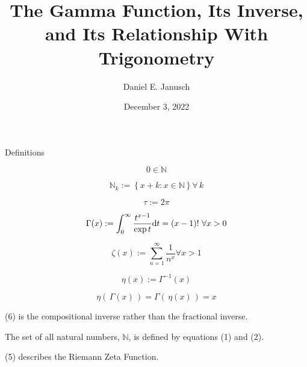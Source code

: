 \documentclass[12pt]{article}
\begin{document}
\title{The Gamma Function, Its Inverse, and Its Relationship With Trigonometry}
\author{Daniel E. Janusch}
\date{December 3, 2022} %
\maketitle

\begin{section}{Definitions}

	\begin{equation}
		0\in\mathbb N
	\end{equation}

	\begin{equation}
		\mathbb N_k:=\left\{x+k:x\in\mathbb N\right\}\forall\,k
	\end{equation}

	\begin{equation}
		\tau:=2\pi
	\end{equation}

	\begin{equation}
		\Gamma(x):=\int_0^\infty\dfrac{t^{x-1}}{\exp t}\text dt=(x-1)!~\forall x>0
	\end{equation}

	\begin{equation}
		\zeta(x):=\sum_{n=1}^\infty\dfrac1{n^x}\forall x>1
	\end{equation}

	\begin{equation}
		\eta(x):=\Gamma^{-1}(x)
	\end{equation}

	\begin{equation}
		\eta(\,\Gamma(x)\,)=\Gamma(\,\eta(x)\,)=x
	\end{equation}

	(6) is the compositional inverse rather than the fractional inverse.

	The set of all natural numbers, $\mathbb N$, is defined by equations (1) and (2).

	(5) describes the Riemann Zeta Function.
\end{section}
\end{document}
